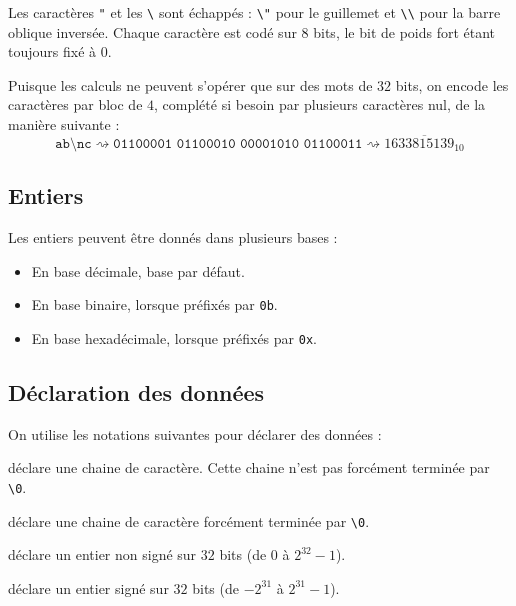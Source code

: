 \documentclass[french, 12pt]{article}
\begin{document}

Les caractères \texttt{"} et les \texttt{\textbackslash} sont échappés :
\texttt{\textbackslash{}"} pour le guillemet et
\texttt{\textbackslash{}\textbackslash{}} pour la barre oblique inversée.
Chaque caractère est codé sur $8$ bits, le bit de poids fort étant toujours
fixé à $0$.

Puisque les calculs ne peuvent s'opérer que sur des mots de $32$ bits, on encode
les caractères par bloc de $4$, complété si besoin par plusieurs caractères nul,
de la manière suivante :
\begin{equation*}
      \texttt{ab\textbackslash{}nc} \rightsquigarrow \texttt{01100001 01100010 00001010 01100011} \rightsquigarrow \overline{1633815139_{10}}
\end{equation*}


\subsection*{Entiers}

Les entiers peuvent être donnés dans plusieurs bases :
\begin{itemize}
      \item En base décimale, base par défaut.
      \item En base binaire, lorsque préfixés par \texttt{0b}.
      \item En base hexadécimale, lorsque préfixés par \texttt{0x}.
\end{itemize}

\subsection*{Déclaration des données}

On utilise les notations suivantes pour déclarer des données :
\begin{description}[leftmargin=!, labelwidth=\widthof{\bf \texttt{.string "..."}}]
      \item[\texttt{.ascii "..."}] déclare une chaine de caractère.
            Cette chaine n'est pas forcément terminée par \verb|\0|.
      \item[\texttt{.string "..."}] déclare une chaine de caractère forcément
            terminée par \verb|\0|.
      \item[\texttt{.uint ...}] déclare un entier non signé sur $32$ bits (de $0$ à $2^{32}-1$).
      \item[\texttt{.int ...}] déclare un entier signé sur $32$ bits (de $-2^{31}$ à $2^{31}-1$).
\end{description}
\end{document}
